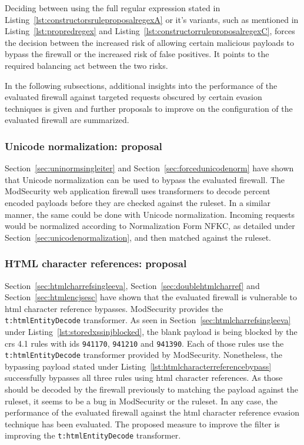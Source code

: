 Deciding between using the full regular expression stated in Listing~\ref{lst:constructorsruleproposalregexA} or it's variants, such as mentioned in Listing~\ref{lst:propredregex} and Listing~\ref{lst:constructorruleproposalregexC}, forces the decision between the increased risk of allowing certain malicious payloads to bypass the firewall or the increased risk of false positives. It points to the required balancing act between the two risks.

\bigskip
In the following subsections, additional insights into the performance of the evaluated firewall against targeted requests obscured by certain evasion techniques is given and further proposals to improve on the configuration of the evaluated firewall are summarized.


\subsubsection{Unicode normalization: proposal}
\label{sec:unicodenormprop}
Section~\ref{sec:uninormsingleiter} and Section~\ref{sec:forcedunicodenorm} have shown that Unicode normalization can be used to bypass the evaluated firewall.
The ModSecurity web application firewall uses transformers to decode percent encoded payloads before they are checked against the ruleset. In a similar manner, the same could be done with Unicode normalization. Incoming requests would be normalized according to Normalization Form NFKC, as detailed under Section~\ref{sec:unicodenormalization}, and then matched against the ruleset.

\subsubsection{HTML character references: proposal}
\label{sec:htmlcharrefprop}
Section~\ref{sec:htmlcharrefsingleeva}, Section~\ref{sec:doublehtmlcharref} and Section~\ref{sec:htmlencjsesc} have shown that the evaluated firewall is vulnerable to \acrshort{html} character reference bypasses. ModSecurity provides the \verb|t:htmlEntityDecode| transformer. As seen in Section~\ref{sec:htmlcharrefsingleeva} under Listing~\ref{lst:storedxssinjblocked}, the blank payload is being blocked by the \acrshort{crs} 4.1 rules with ids \verb|941170|, \verb|941210| and \verb|941390|. Each of those rules use the \verb|t:htmlEntityDecode| transformer provided by ModSecurity. Nonetheless, the bypassing payload stated under Listing~\ref{lst:htmlcharacterreferencebypass} successfully bypasses all three rules using \acrshort{html} character references. As those should be decoded by the firewall previously to matching the payload against the ruleset, it seems to be a bug in ModSecurity or the ruleset. In any case, the performance of the evaluated firewall against the \acrshort{html} character reference evasion technique has been  evaluated. The proposed measure to improve the filter is improving the \verb|t:htmlEntityDecode| transformer.

